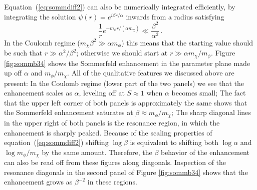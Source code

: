 \documentclass[aps,prd,twocolumn,amsmath,amssymb,floatfix,nofootinbib,10pt]{revtex4}
\newcommand{\somm}{\ensuremath{S}}
\newcommand{\mdm}{\ensuremath{m_{\chi}}}
\newcommand{\mv}{\ensuremath{m_{\phi}}}
\newcommand{\Eqnname}{Equation}
\newcommand{\eqnname}{equation}
\begin{document}
\Eqnname\ (\ref{eq:sommdiff2}) can also be numerically integrated
efficiently, by integrating the solution $\psi(r) = e^{i\beta
r/\alpha}$ inwards from a radius satisfying
\begin{equation}
\frac{1}{r}e^{-\mv r/(\alpha \mdm)} \ll \frac{\beta^2}{\alpha^2} \, .
\end{equation}
In the Coulomb regime ($\mdm \beta^2 \gg \alpha \mv$) this means that
the starting value should be such that $r \gg \alpha^2/\beta^2$;
otherwise we should start at $r \gg \alpha \mdm/\mv$. Figure
\ref{fig:sommb34} shows the Sommerfeld enhancement in the parameter plane
made up off $\alpha$ and $\mv/\mdm$. All of the qualitative features
we discussed above are present: In the Coulomb regime (lower part of
the two panels) we see that the enhancement scales as $\alpha$,
leveling off at $\somm \approx 1$ when $\alpha$ becomes small; The
fact that the upper left corner of both panels is approximately the
same shows that the Sommerfeld enhancement saturates at $\beta \approx
\mv/\mdm$; The sharp diagonal lines in the upper right of both panels
is the resonance region, in which the enhancement is sharply
peaked. Because of the scaling properties of \eqnname\
(\ref{eq:sommdiff2}) shifting $\log\beta$ is equivalent to shifting
both $\log\alpha$ and $\log \mv/\mdm$ by the same amount. Therefore,
the $\beta$ behavior of the enhancement can also be read off from
these figures along diagonals. Inspection of the resonance diagonals
in the second panel of Figure \ref{fig:sommb34} shows that the enhancement
grows as $\beta^{-2}$ in these regions.
\end{document}
